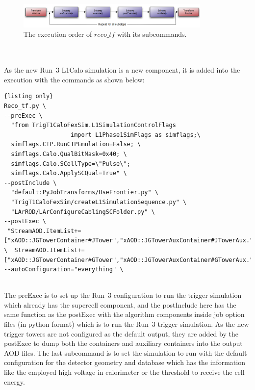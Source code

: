\begin{figure}[!h]                
	\includegraphics[width=0.85\textwidth]{Chapter6/exeOrder.png}
	\begin{center}
		\caption{The execution order of $reco\_tf$ with its subcommands\cite{Stewart:2014ida}.}
		\label{Fig:exeOrder}            
	\end{center}
\end{figure}
\\
\\As the new Run~3 L1Calo simulation is a new component, it is added into the execution with the commands as shown below:
\begin{lstlisting}{listing only}
Reco_tf.py \
--preExec \
  "from TrigT1CaloFexSim.L1SimulationControlFlags 
                   import L1Phase1SimFlags as simflags;\ 
  simflags.CTP.RunCTPEmulation=False; \
  simflags.Calo.QualBitMask=0x40; \
  simflags.Calo.SCellType=\"Pulse\";
  simflags.Calo.ApplySCQual=True" \
--postInclude \
  "default:PyJobTransforms/UseFrontier.py" \
  "TrigT1CaloFexSim/createL1SimulationSequence.py" \
  "LArROD/LArConfigureCablingSCFolder.py" \
--postExec \
 "StreamAOD.ItemList+=["xAOD::JGTowerContainer#JTower","xAOD::JGTowerAuxContainer#JTowerAux."]; \  StreamAOD.ItemList+=["xAOD::JGTowerContainer#GTower","xAOD::JGTowerAuxContainer#GTowerAux."]";
--autoConfiguration="everything" \
\end{lstlisting}
\noindent
\\The preExec is to set up the Run~3 configuration to run the trigger simulation which already has the supercell component, and the postInclude here has the same function as the postExec with the algorithm components inside job option files (in python format) which is to run the Run~3 trigger simulation. As the new trigger towers are not configured as the default output, they are added by the postExec to dump both the containers and auxiliary containers into the output AOD files. The last subcommand is to set the simulation to run with the default configuration for the detector geometry and database which has the information like the employed high voltage in calorimeter or the threshold to receive the cell energy. 

